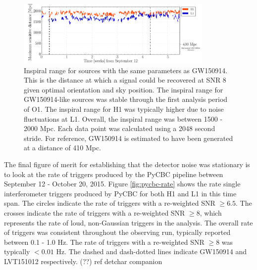 \begin{figure}[ht!]%
\includegraphics[width=0.85\textwidth]{figures/O1/inspiral-range}
\caption[Inspiral range in O1]{Inspiral range for sources with %
         the same parameters as GW150914. This is the distance at %
         which a signal could be recovered at SNR 8 given optimal %
         orientation and sky position. The inspiral range for %
         GW150914-like sources was stable through the first analysis %
         period of O1. The inspiral %
         range for H1 was typically higher due to noise fluctuations %
         at L1. Overall, the inspiral range was between 1500 - 2000 Mpc. %
         Each data point was calculated using a 2048 second stride. %
         For reference, GW150914 is estimated to have been generated at a %
         distance of 410 Mpc. %
         }
\label{fig:inspiral-range}
\end{figure}

The final figure of merit for establishing that the detector noise was 
stationary is to look at the rate of triggers produced by the PyCBC pipeline 
between September 12 - October 20, 2015. Figure \ref{fig:pycbc-rate} shows 
the rate single 
interferometer triggers produced by PyCBC for both H1 and L1 in this time 
span. The circles indicate the rate of triggers with a re-weighted SNR 
$\geq 6.5$. The crosses indicate the rate of triggers with a re-weighted SNR 
$\geq 8$, which represents the rate of loud, non-Gaussian triggers in the 
analysis. The overall rate of triggers was consistent throughout the 
observing run, typically reported between 0.1 - 1.0 Hz. The rate of triggers 
with a re-weighted SNR $\geq 8$ was typically $< 0.01$ Hz. The dashed 
and dash-dotted lines indicate GW150914 and LVT151012 respectively. 
(??) ref detchar companion

